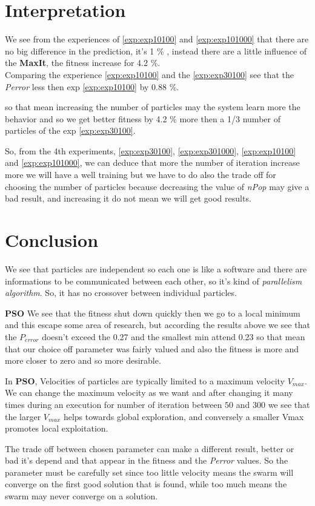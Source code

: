 \section{Interpretation}

We see from the experiences of \ref{exp:exp10100} and \ref{exp:exp101000} that there are no big difference in the prediction, it's 1 \% , instead there are a little influence of the \textbf{MaxIt}, the fitness increase for 4.2 \%.\\
Comparing the experience \ref{exp:exp10100} and the \ref{exp:exp30100} see that the \textit{Perror}  less then exp \ref{exp:exp10100} by 0.88 \%.

so that mean increasing the number of particles may the system learn more the behavior and so we get better fitness by 4.2 \% more then a 1/3 number of particles of the exp \ref{exp:exp30100}.

So, from the 4th experiments, \ref{exp:exp30100}, \ref{exp:exp301000}, \ref{exp:exp10100} and \ref{exp:exp101000},  we can deduce that more the number of iteration increase more we will have a well training but we have to do also the trade off for choosing the number of particles because decreasing the value of \textit{nPop} may give a bad result, and increasing it do not mean we will get good results.

\section{Conclusion}

We see that particles are independent so each one is like a software and there are informations to be communicated between each other, so it's kind of \textit{parallelism algorithm}. So, it has no crossover between individual particles.

\textbf{PSO} We see that the fitness shut down quickly then we go to a local minimum and this escape some area of research, but according the results above we see that the \textit{$ P_{error} $} doesn't exceed the 0.27 and the smallest min attend 0.23 so that mean that our choice off parameter was fairly valued and also the fitness is more and more closer to zero and so more desirable.

In \textbf{PSO}, Velocities of particles are typically limited to a maximum velocity $ V_{max} $. We can change the maximum velocity as we want and after changing it many times during an execution for number of iteration between $ 50 $ and $ 300 $ we see that the larger $ V_{max} $ helps towards global exploration, and conversely a smaller Vmax promotes local exploitation.



The trade off between chosen parameter can make a different result, better or bad it's depend and that appear in the fitness and the \textit{Perror} values.
So the parameter must be carefully set since too little velocity means the swarm will converge on the first good solution that is found, while too much means the swarm may never converge on a solution.





